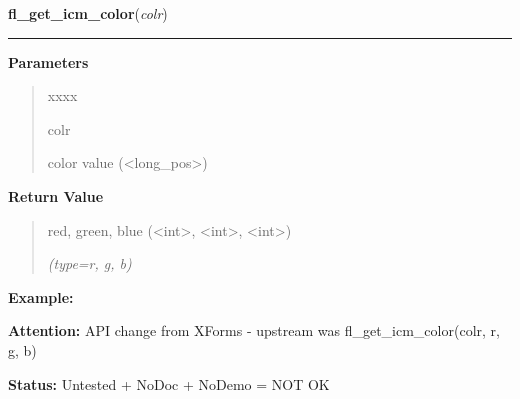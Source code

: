\hspace{.8\funcindent}\begin{boxedminipage}{\funcwidth}

    \raggedright \textbf{fl\_get\_icm\_color}(\textit{colr})

    \vspace{-1.5ex}

    \rule{\textwidth}{0.5\fboxrule}
\setlength{\parskip}{2ex}
\setlength{\parskip}{1ex}
      \textbf{Parameters}
      \vspace{-1ex}

      \begin{quote}
        \begin{Ventry}{xxxx}

          \item[colr]

          color value ({\textless}long\_pos{\textgreater})

        \end{Ventry}

      \end{quote}

      \textbf{Return Value}
    \vspace{-1ex}

      \begin{quote}
      red, green, blue ({\textless}int{\textgreater}, 
      {\textless}int{\textgreater}, {\textless}int{\textgreater})

      {\it (type=r, g, b)}

      \end{quote}

\textbf{Example:} 

\textbf{Attention:} API change from XForms - upstream was fl\_get\_icm\_color(colr, r, g, b)



\textbf{Status:} Untested + NoDoc + NoDemo = NOT OK



    \end{boxedminipage}

    \label{xformslib:library:fl_set_icm_color}

    \vspace{0.5ex}

